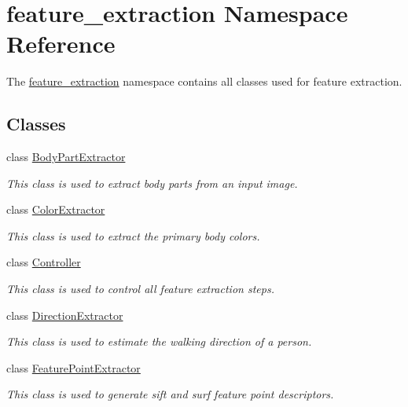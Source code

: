 \hypertarget{namespacefeature__extraction}{}\section{feature\+\_\+extraction Namespace Reference}
\label{namespacefeature__extraction}


The \mbox{\hyperlink{namespacefeature__extraction}{feature\+\_\+extraction}} namespace contains all classes used for feature extraction.  


\subsection*{Classes}
\begin{DoxyCompactItemize}
\item 
class \mbox{\hyperlink{classfeature__extraction_1_1_body_part_extractor}{Body\+Part\+Extractor}}
\begin{DoxyCompactList}\small\item\em This class is used to extract body parts from an input image. \end{DoxyCompactList}\item 
class \mbox{\hyperlink{classfeature__extraction_1_1_color_extractor}{Color\+Extractor}}
\begin{DoxyCompactList}\small\item\em This class is used to extract the primary body colors. \end{DoxyCompactList}\item 
class \mbox{\hyperlink{classfeature__extraction_1_1_controller}{Controller}}
\begin{DoxyCompactList}\small\item\em This class is used to control all feature extraction steps. \end{DoxyCompactList}\item 
class \mbox{\hyperlink{classfeature__extraction_1_1_direction_extractor}{Direction\+Extractor}}
\begin{DoxyCompactList}\small\item\em This class is used to estimate the walking direction of a person. \end{DoxyCompactList}\item 
class \mbox{\hyperlink{classfeature__extraction_1_1_feature_point_extractor}{Feature\+Point\+Extractor}}
\begin{DoxyCompactList}\small\item\em This class is used to generate sift and surf feature point descriptors. \end{DoxyCompactList}\item 

\end{DoxyCompactItemize}
